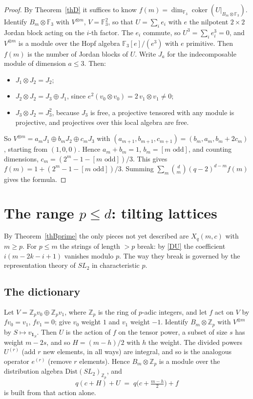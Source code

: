 \documentclass[10pt]{article}
\theoremstyle{ds}
\theoremstyle{dsrem}
\newcommand{\Z}{\mathbb{Z}}
\newcommand{\F}{\mathbb{F}}
\newcommand{\coker}{\operatorname{coker}}
\begin{document}
\begin{proof}
By Theorem~\ref{thD} it suffices to know $f(m)=\dim_{\F_3}\coker(U|_{B_m\otimes\F_3})$. Identify $B_m\otimes\F_3$ with $V^{\otimes m}$, $V=\F_3^2$, so that $U=\sum_ie_i$ with $e$ the nilpotent $2\times2$ Jordan block acting on the $i$-th factor. The $e_i$ commute, so $U^3=\sum_ie_i^3=0$, and $V^{\otimes m}$ is a module over the Hopf algebra $\F_3[e]/(e^3)$ with $e$ primitive. Then $f(m)$ is the number of Jordan blocks of $U$. Write $J_a$ for the indecomposable module of dimension $a\le3$. Then:
\begin{itemize}
\item $J_1\otimes J_2=J_2$;
\item $J_2\otimes J_2=J_3\oplus J_1$, since $e^2(v_0\otimes v_0)=2\,v_1\otimes v_1\ne0$;
\item $J_3\otimes J_2=J_3^2$, because $J_3$ is free, a projective tensored with any module is projective, and projectives over this local algebra are free.
\end{itemize}
So $V^{\otimes m}=a_mJ_1\oplus b_mJ_2\oplus c_mJ_3$ with $(a_{m+1},b_{m+1},c_{m+1})=(b_m,a_m,b_m+2c_m)$, starting from $(1,0,0)$. Hence $a_m+b_m=1$, $b_m=[m\text{ odd}]$, and counting dimensions, $c_m=(2^m-1-[m\text{ odd}])/3$. This gives $f(m)=1+(2^m-1-[m\text{ odd}])/3$. Summing $\sum_m\binom dm(q-2)^{d-m}f(m)$ gives the formula.
\end{proof}

\section{The range $p\le d$: tilting lattices}

By Theorem~\ref{thBprime} the only pieces not yet described are $X_q(m,c)$ with $m\ge p$. For $p\le m$ the strings of length $>p$ break: by \eqref{DU} the coefficient $i(m-2k-i+1)$ vanishes modulo $p$. The way they break is governed by the representation theory of $SL_2$ in characteristic $p$.

\subsection{The dictionary}
Let $V=\Z_p v_0\oplus\Z_p v_1$, where $\Z_p$ is the ring of $p$-adic integers, and let $f$ act on $V$ by $fv_0=v_1$, $fv_1=0$; give $v_0$ weight $1$ and $v_1$ weight $-1$. Identify $B_m\otimes\Z_p$ with $V^{\otimes m}$ by $S\mapsto v_{\mathbf 1_S}$. Then $U$ is the action of $f$ on the tensor power, a subset of size $s$ has weight $m-2s$, and so $H=(m-h)/2$ with $h$ the weight. The divided powers $U^{(r)}$ (add $r$ new elements, in all ways) are integral, and so is the analogous operator $e^{(r)}$ (remove $r$ elements). Hence $B_m\otimes\Z_p$ is a module over the distribution algebra $\mathrm{Dist}(SL_2)_{\Z_p}$, and
\[
q(c+H)+U \;=\; q\big(c+\tfrac{m-h}{2}\big)+f
\]
is built from that action alone.
\end{document}
